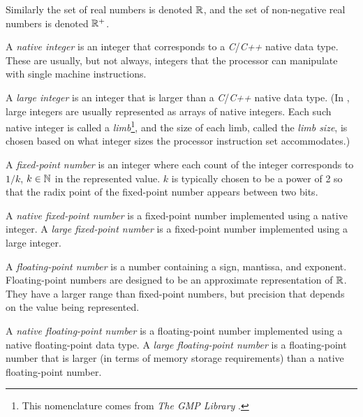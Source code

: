 Similarly the set of real numbers is denoted 
${\mathbb{R}}$, and the set of 
non-negative real numbers is denoted 
${\mathbb{R}^+}$.  

A \emph{native integer} is an integer 
that corresponds to a \emph{C}/\emph{C++} native data type.  
These are usually, but not always, integers that the 
processor can manipulate with single machine instructions.  

A \emph{large integer} is an integer 
that is larger than a \emph{C}/\emph{C++} native data type.  
(In \emph{\productbasenameshort{}}, large integers are 
usually represented as arrays of native integers.  Each such 
native integer is called a \emph{limb}\footnote{This nomenclature comes 
from \emph{The GMP Library} 
\cite{bibref:w:gmplibhomepage}.}, and the size of each limb, 
called the \emph{limb size}, is chosen 
based on what integer sizes the processor instruction set 
accommodates.) 

A \emph{fixed-point number} is an 
integer where each count of the integer corresponds to 
$1/k$, $k \in {\mathbb{N}}$ in the represented value.  
$k$ is typically chosen to be a power of 2 so that the radix 
point of the fixed-point number appears between two bits.  

A \emph{native fixed-point number} is a fixed-point number 
implemented using a native integer.  A \emph{large 
fixed-point number} is a fixed-point number implemented 
using a large integer.  

A \emph{floating-point number} 
is a number containing a sign, mantissa, and exponent.  
Floating-point numbers are designed to be an approximate 
representation of ${\mathbb{R}}$.  They have a larger range 
than fixed-point numbers, but precision that depends on the 
value being represented.  

A \emph{native floating-point number} is a floating-point 
number implemented using a native floating-point data type.  
A \emph{large floating-point number} is a floating-point 
number that is larger (in terms of memory storage 
requirements) than a native floating-point number.  


